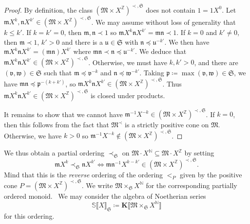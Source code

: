 \documentclass{article}
\newcommand{\assign}{\coloneqq}
\newcommand{\nin}{\not\in}
\newcommand{\tmem}[1]{{\em #1\/}}
\theoremstyle{remark}\newtheorem*{convention*}{Convention}
\begin{document}
\begin{proof}
  By definition, the class $(\mathfrak{M} \times X^{\mathbb{Z}})^{\prec,
  \mathfrak{S}}$ does not contain $1 = 1 X^0$. Let $\mathfrak{m}X^k,
  \mathfrak{n}X^{k'} \in (\mathfrak{M} \times X^{\mathbb{Z}})^{\prec,
  \mathfrak{S}}$. We may assume without loss of generality that $k \leqslant
  k'$. If $k = k' = 0$, then $\mathfrak{m}, \mathfrak{n} \prec 1$ so
  $\mathfrak{m}X^k \mathfrak{n}X^{k'} =\mathfrak{m}\mathfrak{n} \prec 1$. If
  $k = 0$ and $k' \neq 0$, then $\mathfrak{m} \prec 1$, $k' > 0$ and there is
  a $\mathfrak{u} \in \mathfrak{S}$ with $\mathfrak{n} \preccurlyeq
  \mathfrak{u}^{- k'}$. We then have $\mathfrak{m}X^k \mathfrak{n}X^{k'} =
  (\mathfrak{m}\mathfrak{n}) X^{k'}$ where $\mathfrak{m}\mathfrak{n} \prec
  \mathfrak{n} \preccurlyeq \mathfrak{u}^{- k'}$. We deduce that
  $\mathfrak{m}X^k \mathfrak{n}X^{k'} \in (\mathfrak{M} \times
  X^{\mathbb{Z}})^{\prec, \mathfrak{S}}$. Otherwise, we must have $k, k' > 0$,
  and there are $(\mathfrak{v}, \mathfrak{w}) \in \mathfrak{S}$ such that
  $\mathfrak{m} \preccurlyeq \mathfrak{v}^{- k}$ and $\mathfrak{n}
  \preccurlyeq \mathfrak{w}^{- k'}$. Taking $\mathfrak{p} \assign \max
  (\mathfrak{v}, \mathfrak{w}) \in \mathfrak{S}$, we have
  $\mathfrak{m}\mathfrak{n} \preccurlyeq \mathfrak{p}^{- (k + k')}$, so
  $\mathfrak{m}X^k \mathfrak{n}X^{k'} \in (\mathfrak{M} \times
  X^{\mathbb{Z}})^{\prec, \mathfrak{S}}$. Thus $\mathfrak{m}X^k
  \mathfrak{n}X^{k'} \in (\mathfrak{M} \times X^{\mathbb{Z}})^{\prec,
  \mathfrak{S}}$ is closed under products.
  
  It remains to show that we cannot have $\mathfrak{m}^{- 1} X^{- k} \in
  (\mathfrak{M} \times X^{\mathbb{Z}})^{\prec, \mathfrak{S}}$. If $k = 0$,
  then this follows from the fact that $\mathfrak{M}^{\prec}$ is a strictly
  positive cone on $\mathfrak{M}$. Otherwise, we have $k > 0$ so
  $\mathfrak{m}^{- 1} X^{- k} \nin (\mathfrak{M} \times
  X^{\mathbb{Z}})^{\prec, \mathfrak{S}}$.
\end{proof}

We thus obtain a partial ordering $\prec_{\mathfrak{S}}$\label{autolab20} on
$\mathfrak{M} \cdot X^{\mathbb{N}} \subseteq \mathfrak{M} \cdot
X^{\mathbb{Z}}$ by setting
\[ \mathfrak{m}X^k \prec_{\mathfrak{S}} \mathfrak{n}X^{k'} \Longleftrightarrow
   \mathfrak{m}\mathfrak{n}^{- 1} X^{k - k'} \in (\mathfrak{M} \times
   X^{\mathbb{Z}})^{\prec, \mathfrak{S}} . \]
Mind that this is the {\tmem{reverse}} ordering of the ordering $<_P$ given by
the positive cone $P = (\mathfrak{M} \times X^{\mathbb{Z}})^{\prec,
\mathfrak{S}}$. We write $\mathfrak{M} \times_{\mathfrak{S}} X^{\mathbb{N}}$
for the corresponding partially ordered monoid. \ We may consider the algebra
of Noetherian series\label{autolab21}
\[ \mathbb{S} \llbracket X \rrbracket_{\mathfrak{S}} \assign \mathbf{K}
   \llbracket \mathfrak{M} \times_{\mathfrak{S}} X^{\mathbb{N}} \rrbracket \]
for this ordering.
\end{document}
